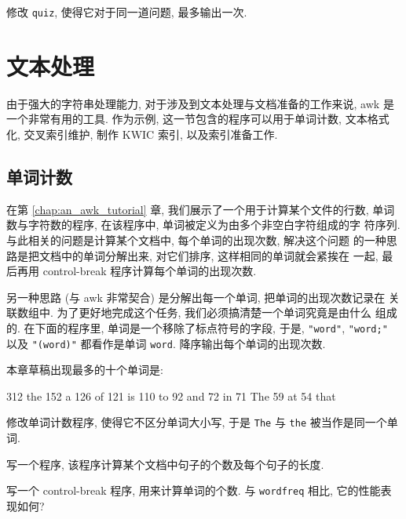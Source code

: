\begin{exercise}
    修改 \texttt{quiz}, 使得它对于同一道问题, 最多输出一次.
\end{exercise}

\section{文本处理}
\label{sec:text_processing}

由于强大的字符串处理能力, 对于涉及到文本处理与文档准备的工作来说, awk 是
一个非常有用的工具. 作为示例, 这一节包含的程序可以用于单词计数, 文本格式
化, 交叉索引维护, 制作 KWIC 索引, 以及索引准备工作.

\subsection{单词计数}
\label{subsec:word_counts}

在第 \ref{chap:an_awk_tutorial} 章, 我们展示了一个用于计算某个文件的行数,
单词数与字符数的程序, 在该程序中, 单词被定义为由多个非空白字符组成的字
符序列. 与此相关的问题是计算某个文档中, 每个单词的出现次数, 解决这个问题
的一种思路是把文档中的单词分解出来, 对它们排序, 这样相同的单词就会紧挨在
一起, 最后再用 control-break 程序计算每个单词的出现次数.

另一种思路 (与 awk 非常契合) 是分解出每一个单词, 把单词的出现次数记录在
关联数组中. 为了更好地完成这个任务, 我们必须搞清楚一个单词究竟是由什么
组成的. 在下面的程序里, 单词是一个移除了标点符号的字段, 于是,
\texttt{"word"}, \texttt{"word;"} 以及 \texttt{"(word)"} 都看作是单词
\texttt{word}. \END 降序输出每个单词的出现次数.
本章草稿出现最多的十个单词是:
\begin{file}
    312 the     152 a       126 of      121 is      110 to
    92 and      72 in       71 The      59 at       54 that
\end{file}

\begin{exercise}
    修改单词计数程序, 使得它不区分单词大小写, 于是 \texttt{The} 与
    \texttt{the} 被当作是同一个单词.
\end{exercise}

\begin{exercise}
    写一个程序, 该程序计算某个文档中句子的个数及每个句子的长度.
\end{exercise}

\begin{exercise}
    写一个 control-break 程序, 用来计算单词的个数. 与 \texttt{wordfreq} 
    相比, 它的性能表现如何?
\end{exercise}
